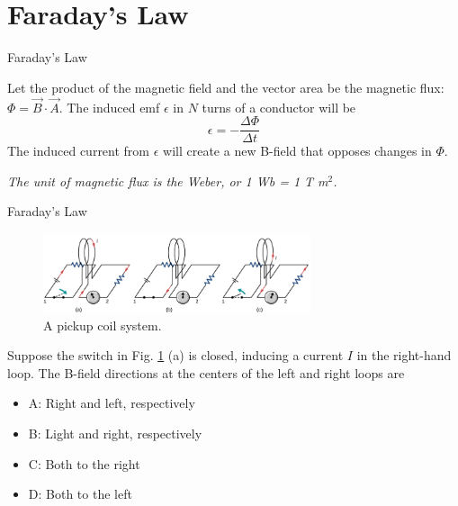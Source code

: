 \documentclass{beamer}
\begin{document}
\section{Faraday's Law}

\begin{frame}{Faraday's Law}
\begin{tcolorbox}[colback=white,colframe=black!40!black,title=Faraday's Law]
\alert{Let the product of the magnetic field and the vector area be the magnetic flux: $\Phi = \vec{B} \cdot \vec{A}$.  The induced emf $\epsilon$ in $N$ turns of a conductor will be
\begin{equation}
\epsilon = - \frac{\Delta\Phi}{\Delta t}
\label{eq:farad}
\end{equation}
The induced current from $\epsilon$ will create a new B-field that opposes changes in $\Phi$.}
\end{tcolorbox}
\textit{The unit of magnetic flux is the Weber, or 1 Wb = 1 T m$^2$.}
\end{frame}

\begin{frame}{Faraday's Law}
\small
\begin{figure}
\centering
\includegraphics[width=0.7\textwidth]{figures/farad2.png}
\caption{\label{fig:loop1} A pickup coil system.}
\end{figure}
Suppose the switch in Fig. \ref{fig:loop1} (a) is closed, inducing a current $I$ in the right-hand loop.  The B-field directions at the centers of the left and right loops are
\begin{itemize}
\item A: Right and left, respectively
\item B: Light and right, respectively
\item C: Both to the right
\item D: Both to the left
\end{itemize}
\end{frame}
\end{document}
